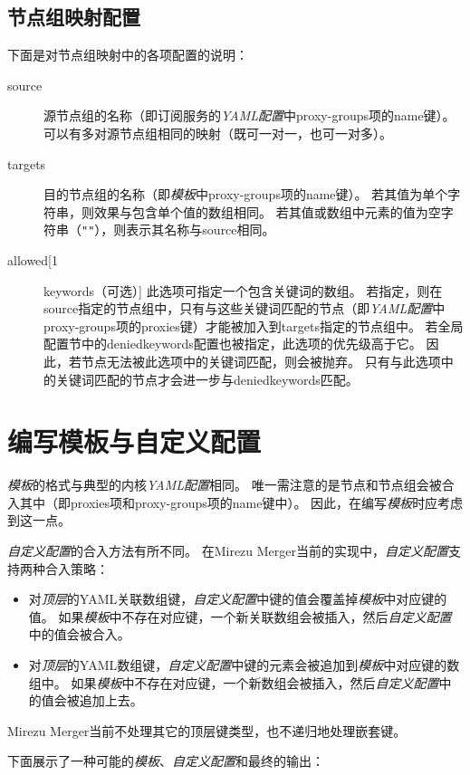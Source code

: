 \documentclass[a4paper,fontset=founder,punct=kaiming]{ctexart}
\renewcommand\_{\textunderscore\linebreak[1]}
\newcommand{\productname}{Mirezu Merger}
\begin{document}
\subsection{节点组映射配置}
\label{sec:groupmap}

下面是对节点组映射中的各项配置的说明：
\begin{description}
\item[source] 源节点组的名称（即订阅服务的\emph{YAML配置}中proxy-groups项的name键）。
  可以有多对源节点组相同的映射（既可一对一，也可一对多）。
\item[targets] 目的节点组的名称（即\emph{模板}中proxy-groups项的name键）。
  若其值为单个字符串，则效果与包含单个值的数组相同。
  若其值或数组中元素的值为空字符串（\verb|""|），则表示其名称与source相同。
\item[allowed\_keywords（可选）] 此选项可指定一个包含关键词的数组。
  若指定，则在source指定的节点组中，只有与这些关键词匹配的节点（即\emph{YAML配置}中proxy-groups项的proxies键）才能被加入到targets指定的节点组中。
  若全局配置节中的denied\_key\-words配置也被指定，此选项的优先级高于它。
  因此，若节点无法被此选项中的关键词匹配，则会被抛弃。
  只有与此选项中的关键词匹配的节点才会进一步与denied\_key\-words匹配。
\end{description}

\section{编写模板与自定义配置}
\label{sec:template}

\emph{模板}的格式与典型的内核\emph{YAML配置}相同。
唯一需注意的是节点和节点组会被合入其中（即proxies项和proxy-groups项的name键中）。
因此，在编写\emph{模板}时应考虑到这一点。

\emph{自定义配置}的合入方法有所不同。
在\productname 当前的实现中，\emph{自定义配置}支持两种合入策略：
\begin{itemize}
\item 对\emph{顶层}的YAML关联数组键，\emph{自定义配置}中键的值会覆盖掉\emph{模板}中对应键的值。
  如果\emph{模板}中不存在对应键，一个新关联数组会被插入，然后\emph{自定义配置}中的值会被合入。
\item 对\emph{顶层}的YAML数组键，\emph{自定义配置}中键的元素会被追加到\emph{模板}中对应键的数组中。
  如果\emph{模板}中不存在对应键，一个新数组会被插入，然后\emph{自定义配置}中的值会被追加上去。
\end{itemize}
\productname 当前不处理其它的顶层键类型，也不递归地处理嵌套键。

下面展示了一种可能的\emph{模板}、\emph{自定义配置}和最终的输出：
\end{document}
